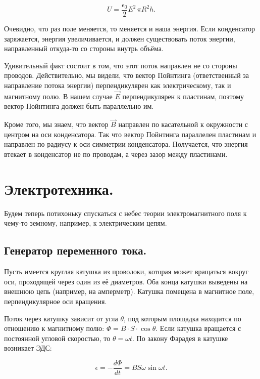 \documentclass[12pt,a4paper]{article}
\numberwithin{equation}{section}
\numberwithin{equation}{section}
\newcommand{\eps}{\epsilon}
\begin{document}
\begin{equation}
  \label{eq:energy_cap}
  U = \frac{\eps_0}{2} E^2 \, \pi R^2 h.
\end{equation}

Очевидно, что раз поле меняется, то меняется и наша энергия. Если
конденсатор заряжается, энергия увеличивается, и должен существовать
поток энергии, направленный откуда-то со стороны внутрь объёма. 

Удивительный факт состоит в том, что этот поток направлен не со
стороны проводов. Действительно, мы видели, что вектор Пойнтинга
(ответственный за направление потока энергии) перпендикулярен как
электрическому, так и магнитному полю. В нашем случае $\vec{E}$
перпендикулярен к пластинам, поэтому вектор Пойнтинга должен быть
параллельно им. 

Кроме того, мы знаем, что вектор $\vec{B}$ направлен по касательной к
окружности с центром на оси конденсатора. Так что вектор Пойнтинга
параллелен пластинам и направлен по радиусу к оси симметрии
конденсатора. Получается, что энергия втекает в конденсатор не по
проводам, а через зазор между пластинами. 


\section{Электротехника.}
\label{sec:electrotechnics}

Будем теперь потихоньку спускаться с небес теории электромагнитного
поля к чему-то земному, например, к электрическим цепям.

\subsection{Генератор переменного тока. }
\label{sec:generator}

Пусть имеется круглая катушка из проволоки, которая может вращаться
вокруг оси, проходящей через один из её диаметров. Оба конца катушки
выведены на внешнюю цепь (например, на амперметр). Катушка помещена в
магнитное поле, перпендикулярное оси вращения. 

Поток через катушку зависит от угла $\theta$, под которым площадка находится по
отношению к магнитному полю: $\Phi = B\cdot S \cdot \cos \theta$. Если
катушка вращается с постоянной угловой скоростью, то $\theta = \omega
t$. По закону Фарадея в катушке возникает ЭДС:

\begin{equation}
  \label{eq:generator_faradey}
  \eps = -\frac{d \Phi}{dt}  = B S \omega \sin \omega t.
\end{equation}
\end{document}
